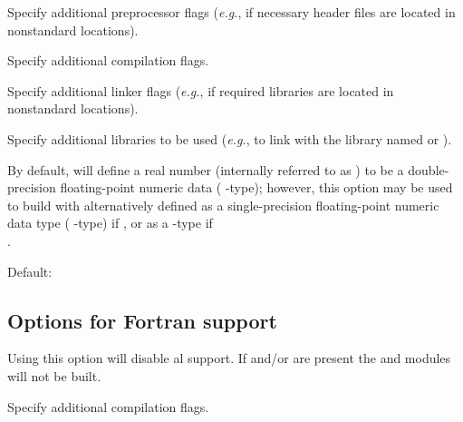 \begin{config}
\item {}

  Specify additional {\C} preprocessor flags 
  ({\em e.g.},  if necessary header files are located in nonstandard locations).

\item {}

  Specify additional {\C} compilation flags.

\item {}

  Specify additional linker flags 
  ({\em e.g.},  if required libraries are located in nonstandard locations).

\item {}

  Specify additional libraries to be used 
  ({\em e.g.},  to link with the library named  or ).

\item {}

  By default, {\sundials} will define a real number (internally referred to as
  ) to be a double-precision floating-point numeric data (
  {\C}-type); however, this option may be used to build {\sundials} with 
  alternatively defined as a single-precision floating-point numeric data type
  ( {\C}-type) if , or as a  {\C}-type
  if \\ .

  Default: 

\end{config}


\subsection*{Options for Fortran support}

\begin{config}

\item {}

  Using this option will disable al {\F} support. If {\cvode} and/or {\kinsol}
  are present the {\fcvode} and {\fkinsol} modules will not be built.

\item {}

  Specify additional {\F} compilation flags.

\end{config}

